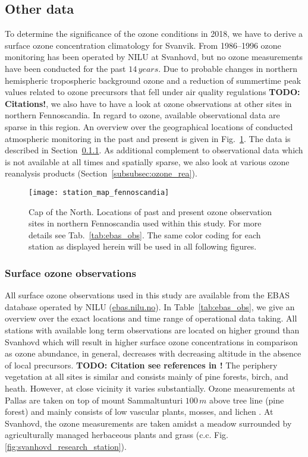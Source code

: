 \documentclass[bg, manuscript]{copernicus}
\begin{document}
\subsection{Other data}
\label{subsec:other_data}
To determine the significance of the ozone conditions in 2018, we have to derive a surface ozone concentration climatology for Svanvik. From 1986--1996 ozone monitoring has been operated by NILU at Svanhovd, but no ozone measurements have been conducted for the past $14\,\unit{years}$. Due to probable changes in northern hemispheric tropospheric background ozone and a reduction of summertime peak values related to ozone precursors that fell under air quality regulations {\bf TODO: Citations!}, we also have to have a look at ozone observations at other sites in northern Fennoscandia. In regard to ozone, available observational data are sparse in this region. An overview over the geographical locations of conducted atmospheric monitoring in the past and present is given in Fig.~\ref{fig:station_map_fennoscandia}. The data is described in Section~\ref{subsubsec:ebas}. 
As additional complement to observational data which is not available at all times and spatially sparse, we also look at various ozone reanalysis products (Section~\ref{subsubsec:ozone_rea}).

\begin{figure}[t]
  \texttt{[image: station\_map\_fennoscandia]}
  \caption{Cap of the North. Locations of past and present ozone observation sites in northern Fennoscandia used within this study. For more details see Tab.~\ref{tab:ebas_obs}. The same color coding for each station as displayed herein will be used in all following figures.}
  \label{fig:station_map_fennoscandia}
\end{figure}

\subsubsection{Surface ozone observations}
\label{subsubsec:ebas}
All surface ozone observations used in this study are available from the EBAS database operated by NILU (\href{http://ebas.nilu.no/}{ebas.nilu.no}). In Table~\ref{tab:ebas_obs}, we give an overview over the exact locations and time range of operational data taking. All stations with available long term observations are located on higher ground than Svanhovd which will result in higher surface ozone concentrations in comparison as ozone abundance, in general, decreases with decreasing altitude in the absence of local precursors. {\bf TODO: Citation see references in \citet{AB:Klingberg2009}!} The periphery vegetation at all sites is similar and consists mainly of pine forests, birch, and heath. However, at close vicinity it varies substantially. Ozone measurements at Pallas are taken on top of mount Sammaltunturi $100\,\unit{m}$ above tree line (pine forest) and mainly consists of low vascular plants, mosses, and lichen \citep{BER:Hatakka2003}. At Svanhovd, the ozone measurements are taken amidst a meadow surrounded by agriculturally managed herbaceous plants and grass (c.c. Fig.\ref{fig:svanhovd_research_station}).
\end{document}
